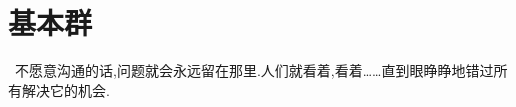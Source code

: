 \chapter{基本群}
\begin{center}
\textcolor[RGB]{255, 0, 0}{\faHeart}~不愿意沟通的话,问题就会永远留在那里.人们就看着,看着……直到眼睁睁地错过所有解决它的机会.~\textcolor[RGB]{255, 0, 0}{\faHeart}
\end{center}
\begin{center}
\end{center}


